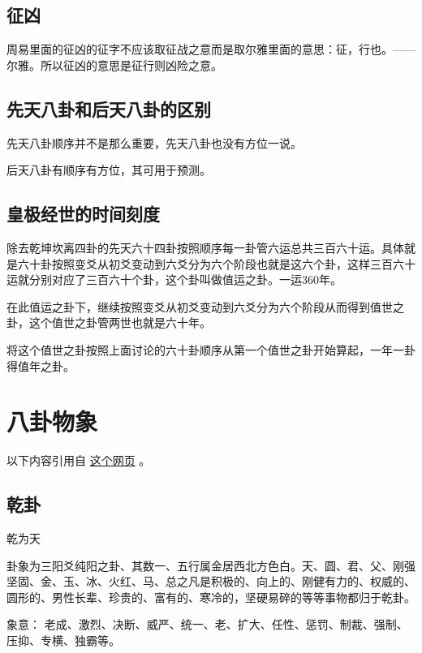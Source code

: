 \documentclass[12pt,oneside]{book}
\begin{document}
\section{征凶}
周易里面的征凶的征字不应该取征战之意而是取尔雅里面的意思：征，行也。——尔雅。所以征凶的意思是征行则凶险之意。

\section{先天八卦和后天八卦的区别}
先天八卦顺序并不是那么重要，先天八卦也没有方位一说。

后天八卦有顺序有方位，其可用于预测。


\section{皇极经世的时间刻度}
除去乾坤坎离四卦的先天六十四卦按照顺序每一卦管六运总共三百六十运。具体就是六十卦按照变爻从初爻变动到六爻分为六个阶段也就是这六个卦，这样三百六十运就分别对应了三百六十个卦，这个卦叫做值运之卦。一运360年。

在此值运之卦下，继续按照变爻从初爻变动到六爻分为六个阶段从而得到值世之卦，这个值世之卦管两世也就是六十年。

将这个值世之卦按照上面讨论的六十卦顺序从第一个值世之卦开始算起，一年一卦得值年之卦。

\chapter{八卦物象}
以下内容引用自 \href{https://www.douban.com/note/684840565/}{这个网页} 。

\section{乾卦}
乾为天

卦象为三阳爻纯阳之卦、其数一、五行属金居西北方色白。天、圆、君、父、刚强坚固、金、玉、冰、火红、马、总之凡是积极的、向上的、刚健有力的、权威的、圆形的、男性长辈、珍贵的、富有的、寒冷的，坚硬易碎的等等事物都归于乾卦。

象意： 老成、激烈、决断、威严、统一、老、扩大、任性、惩罚、制裁、强制、压抑、专横、独霸等。
\end{document}
